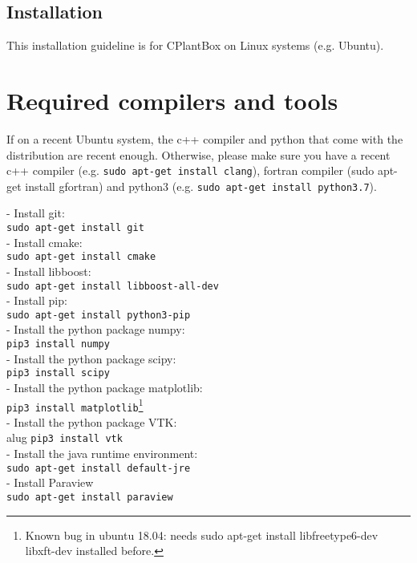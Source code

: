 \newpage

\subsection{Installation}

This installation guideline is for CPlantBox on Linux systems (e.g. Ubuntu). 

\section*{Required compilers and tools}
%
If on a recent Ubuntu system, the c++ compiler and python that come with the distribution are recent enough. Otherwise, please make sure you have a recent c++ compiler (e.g. \lstinline{sudo apt-get install clang}), fortran compiler (sudo apt-get install gfortran) and python3 (e.g. \lstinline{sudo apt-get install python3.7}). 

- Install git: \\
\lstinline{sudo apt-get install git}\\
- Install cmake:\\
\lstinline{sudo apt-get install cmake}\\
- Install libboost:\\
\lstinline{sudo apt-get install libboost-all-dev}\\
- Install pip:\\
\lstinline{sudo apt-get install python3-pip}\\
- Install the python package numpy:\\
\lstinline{pip3 install numpy}\\
- Install the python package scipy:\\
\lstinline{pip3 install scipy}\\
- Install the python package matplotlib:\\
\lstinline{pip3 install matplotlib}\footnote{Known bug in ubuntu 18.04: needs sudo apt-get install libfreetype6-dev libxft-dev installed before.}\\
- Install the python package VTK:\\alug
\lstinline {pip3 install vtk}\\
- Install the java runtime environment:\\
\lstinline{sudo apt-get install default-jre}\\
- Install Paraview\\
\lstinline{sudo apt-get install paraview}\\

